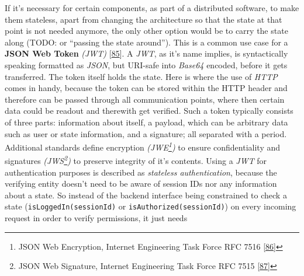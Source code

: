 \documentclass[12pt,english,a4paper,titlepage,cleardoublepage=empty,dottedtoc]{report}
\begin{document}
If it's necessary for certain components, as part of a distributed
software, to make them stateless, apart from changing the architecture
so that the state at that point is not needed anymore, the only other
option would be to carry the state along (TODO: or ``passing the state
around''). This is a common use case for a
\textbf{\protect\hypertarget{link_jwt}{}{JSON Web Token}} \emph{(JWT)}
{[}\protect\hyperlink{ref-web_spec_json-web-token}{85}{]}. A \emph{JWT},
as it's name implies, is syntactically speaking formatted as
\emph{JSON}, but URI-safe into \emph{Base64} encoded, before it gets
transferred. The token itself holds the state. Here is where the use of
\emph{HTTP} comes in handy, because the token can be stored within the
HTTP header and therefore can be passed through all communication
points, where then certain data could be readout and therewith get
verified. Such a token typically consists of three parts: information
about itself, a payload, which can be arbitrary data such as user or
state information, and a signature; all separated with a period.
Additional standards define encryption \emph{(JWE\footnote{JSON Web
  Encryption, Internet Engineering Task Force RFC 7516
  {[}\protect\hyperlink{ref-web_spec_json-web-encryption}{86}{]}})} to
ensure confidentiality and signatures \emph{(JWS\footnote{JSON Web
  Signature, Internet Engineering Task Force RFC 7515
  {[}\protect\hyperlink{ref-web_spec_json-web-signature}{87}{]}})} to
preserve integrity of it's contents. Using a \emph{JWT} for
authentication purposes is described as \emph{stateless authentication},
because the verifying entity doesn't need to be aware of session IDs nor
any information about a state. So instead of the backend interface being
constrained to check a state (\texttt{isLoggedIn(sessionId)} or
\texttt{isAuthorized(sessionId)}) on every incoming request in order to
verify permissions, it just needs
\end{document}
